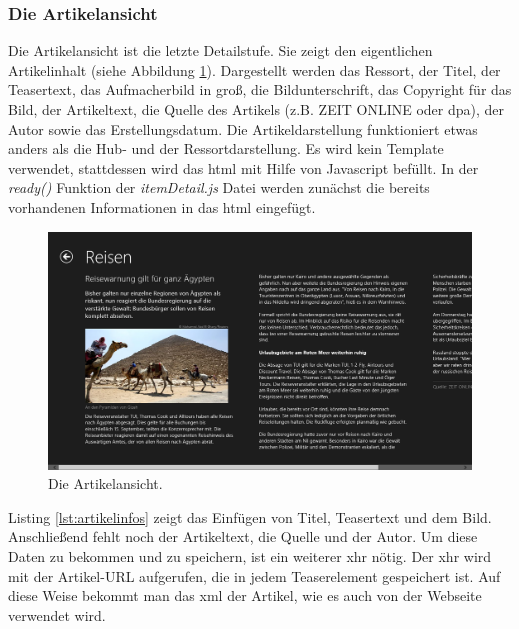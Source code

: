 \documentclass[12pt,a4paper,bibtotoc,abstracton]{scrartcl}
\begin{document}
\subsubsection{Die Artikelansicht}
\label{subsubsec:artikelansicht}
Die Artikelansicht ist die letzte Detailstufe. Sie zeigt den eigentlichen Artikelinhalt (siehe Abbildung \ref{fig:artikelansicht}). Dargestellt werden das Ressort, der Titel, der Teasertext, das Aufmacherbild in groß, die Bildunterschrift, das Copyright für das Bild, der Artikeltext, die Quelle des Artikels (z.B. ZEIT ONLINE oder dpa), der Autor sowie das Erstellungsdatum. Die Artikeldarstellung funktioniert etwas anders als die Hub- und der Ressortdarstellung. Es wird kein Template verwendet, stattdessen wird das \ac{html} mit Hilfe von Javascript befüllt. In der \textit{ready()} Funktion der \textit{itemDetail.js} Datei werden zunächst die bereits vorhandenen Informationen in das \ac{html} eingefügt.

\begin{figure}[h]
	\centering
	\includegraphics[width=\textwidth]{Bilder/Screenshots/app/reise_aegypten_4d.png} 
	\caption{Die Artikelansicht.}
	\label{fig:artikelansicht}
\end{figure}

Listing \ref{lst:artikelinfos} zeigt das Einfügen von Titel, Teasertext und  dem Bild. Anschließend fehlt noch der Artikeltext, die Quelle und der Autor. Um diese Daten zu bekommen und zu speichern, ist ein weiterer \ac{xhr} nötig. Der \ac{xhr} wird mit der Artikel-URL aufgerufen, die in jedem Teaserelement gespeichert ist. Auf diese Weise bekommt man das \ac{xml} der Artikel, wie es auch von der Webseite verwendet wird. 

\begin{minipage}{\linewidth}
  
\end{minipage}
\end{document}
